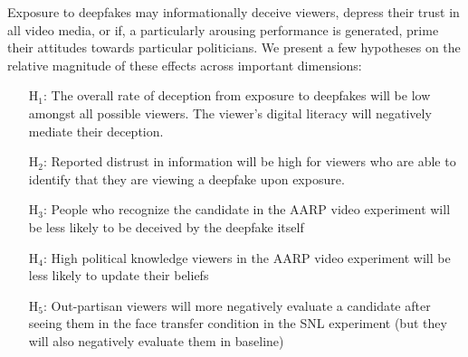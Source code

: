 Exposure to deepfakes may informationally deceive viewers, depress
their trust in all video media, or if, a particularly arousing
performance is generated, prime their attitudes towards particular
politicians. We present a few hypotheses on the relative magnitude of
these effects across important dimensions:

\begin{itemize}

\item[H$_1$:] The overall rate of deception from exposure to deepfakes
  will be low amongst all possible viewers. The viewer’s digital
  literacy will negatively mediate their deception.

\item[H$_2$:] Reported distrust in information will be high for viewers
  who are able to identify that they are viewing a deepfake upon
  exposure.

\item[H$_3$:] People who recognize the candidate in the AARP video
  experiment will be less likely to be deceived by the deepfake itself

\item[H$_4$:] High political knowledge viewers in the AARP video
  experiment will be less likely to update their beliefs

\item[H$_5$:] Out-partisan viewers will more negatively evaluate a
  candidate after seeing them in the face transfer condition in the
  SNL experiment (but they will also negatively evaluate them in
  baseline)
\end{itemize}
